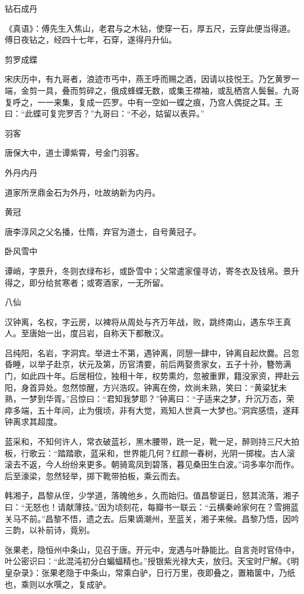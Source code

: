 \documentclass[a4paper,12pt,UTF8,twoside]{ctexbook}
\begin{document}
    钻石成丹
    
    《真语》：傅先生入焦山，老君与之木钻，使穿一石，厚五尺，云穿此便当得道。傅日夜钻之，经四十七年，石穿，遂得丹升仙。
    
    剪罗成蝶
    
    宋庆历中，有九哥者，浪迹市丐中，燕王呼而赐之酒，因请以技悦王。乃乞黄罗一端，金剪一具，叠而剪碎之，俄成蜂蝶无数，或集王襟袖，或乱栖宫人鬓鬟。九哥复呼之，一一来集，复成一匹罗。中有一空如一蝶之痕，乃宫人偶捉之耳。王曰：“此蝶可复完罗否？”九哥曰：“不必，姑留以表异。”
    
    羽客
    
    唐保大中，道士谭紫霄，号金门羽客。
    
    外丹内丹
    
    道家所烹鼎金石为外丹，吐故纳新为内丹。
    
    黄冠
    
    唐李淳风之父名播，仕隋，弃官为道士，自号黄冠子。
    
    卧风雪中
    
    谭峭，字景升，冬则衣绿布衫，或卧雪中；父常遣家僮寻访，寄冬衣及钱帛。景升得之，即分给贫寒者；或寄酒家，一无所留。
    
    八仙
    
    汉钟离，名权，字云房，以裨将从周处与齐万年战，败，跳终南山，遇东华王真人。至唐始一出，度吕岩，自称天下都散汉。
    
    吕纯阳，名岩，字洞宾。举进士不第，遇钟离，同憩一肆中，钟离自起炊爨。吕忽昏睡，以举子赴京，状元及第，历官清要，前后两娶贵家女，五子十孙，簪笏满门，如此四十年。后居相位，独相十年，权势熏灼，忽被重罪，籍没家资，押赴云阳，身首异处。忽然惊醒，方兴浩叹。钟离在傍，炊尚未熟，笑曰：“黄粱犹未熟，一梦到华胥。”吕惊曰：“君知我梦耶？”钟离曰：“子适来之梦，升沉万态，荣瘁多端，五十年间，止为俄顷，非有大觉，焉知人世真一大梦也。”洞宾感悟，遂拜钟离求其超度。
    
    蓝采和，不知何许人，常衣破蓝衫，黑木腰带，跣一足，靴一足，醉则持三尺大拍板，行歌云：“踏踏歌，蓝采和，世界能几何？红颜一春树，光阴一掷梭。古人滚滚去不返，今人纷纷来更多。朝骑鸾凤到碧落，暮见桑田生白波。”词多率尔而作。后至濠梁，忽然轻举，掷下靴带拍板，乘云而去。
    
    韩湘子，昌黎从侄，少学道，落魄他乡，久而始归。值昌黎诞日，怒其流落，湘子曰：“无怒也！请献薄技。”因为顷刻花，每瓣书一联云：“云横秦岭家何在？雪拥蓝关马不前。”昌黎不悟，遗之去。后果谪潮州，至蓝关，湘子来候。昌黎乃悟，因吟三韵，以补前诗，竟别。
    
    张果老，隐恒州中条山，见召于唐。开元中，宠遇与叶静能比。自言尧时官侍中，叶公密识曰：“此混沌初分白蝙蝠精也。”授银紫光禄大夫，放归。天宝时尸解。《明皇杂录》：张果老隐于中条山，常乘白驴，日行万里，夜即叠之，置箱箧中，乃纸也，乘则以水噀之，复成驴。
    
\end{document}
